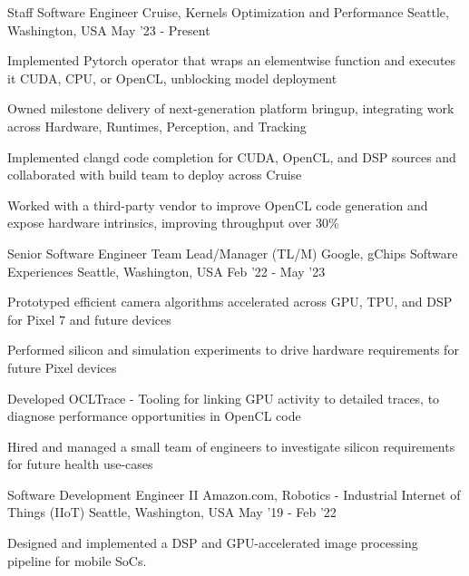 \begin{cventries}
\cventry
    {Staff Software Engineer} %
    {Cruise, Kernels Optimization and Performance} %
    {Seattle, Washington, USA} %
    {May '23 - Present} %
    {
        \begin{cvitems}
          \item Implemented Pytorch operator that wraps an elementwise function and executes it CUDA, CPU, or OpenCL, unblocking model deployment
          \item Owned milestone delivery of next-generation platform bringup, integrating work across Hardware, Runtimes, Perception, and Tracking
          \item Implemented clangd code completion for CUDA, OpenCL, and DSP sources and collaborated with build team to deploy across Cruise
          \item Worked with a third-party vendor to improve OpenCL code generation and expose hardware intrinsics, improving throughput over 30\%
        \end{cvitems}
    }
\vspace{4mm}
\cventry
    {Senior Software Engineer Team Lead/Manager (TL/M)} %
    {Google, gChips Software Experiences} %
    {Seattle, Washington, USA} %
    {Feb '22 - May '23} %
    {
        \begin{cvitems}
          \item Prototyped efficient camera algorithms accelerated across GPU, TPU, and DSP for Pixel 7 and future devices
          \item Performed silicon and simulation experiments to drive hardware requirements for future Pixel devices
          \item Developed OCLTrace - Tooling for linking GPU activity to detailed traces, to diagnose performance opportunities in OpenCL code
          \item Hired and managed a small team of engineers to investigate silicon requirements for future health use-cases
        \end{cvitems}
    }
\vspace{4mm}
\cventry
    {Software Development Engineer II} %
    {Amazon.com, Robotics - Industrial Internet of Things (IIoT)} %
    {Seattle, Washington, USA} %
    {May '19 - Feb '22} %
    {
        \begin{cvitems}
            \item Designed and implemented a DSP and GPU-accelerated image processing pipeline for mobile SoCs.

\end{cvitems}}
\end{cventries}
